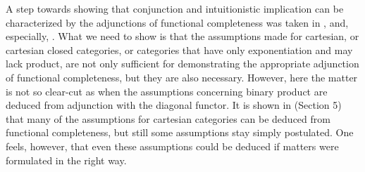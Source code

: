 A step towards showing that conjunction and intuitionistic implication can
be characterized by the adjunctions of functional completeness was taken in 
\cite{D.92}, and, especially, \cite{DP96}. What we need to show is that the
assumptions made for cartesian, or cartesian closed categories, or
categories that have only exponentiation and may lack product, are not only
sufficient for demonstrating the appropriate adjunction of functional
completeness, but they are also necessary. However, here the matter is not
so clear-cut as when the assumptions concerning binary product are deduced
from adjunction with the diagonal functor. It is shown in \cite{DP96}
(Section 5) that many of the assumptions for cartesian categories can be
deduced from functional completeness, but still some assumptions stay simply
postulated. One feels, however, that even these assumptions could be deduced
if matters were formulated in the right way.\bigskip

